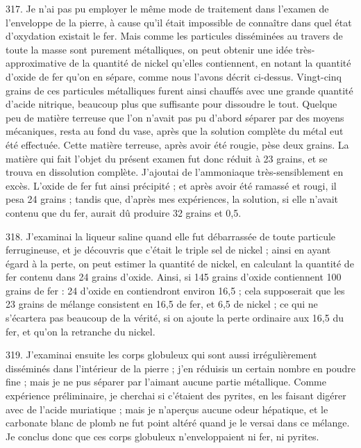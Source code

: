 \documentclass[a4paper, 11pt, oneside, polutonikogreek, french]{article}
\begin{document}
317. Je n'ai pas pu employer le même mode de traitement dans l'examen de l'enveloppe de la pierre, à cause qu'il était impossible de connaître dans quel état d'oxydation existait le fer. Mais comme les particules disséminées au travers de toute la masse sont purement métalliques, on peut obtenir une idée très-approximative de la quantité de nickel qu'elles contiennent, en notant la quantité d'oxide de fer qu'on en sépare, comme nous l'avons décrit ci-dessus. Vingt-cinq grains de ces particules métalliques furent ainsi chauffés avec une grande quantité d'acide nitrique, beaucoup plus que suffisante pour dissoudre le tout. Quelque peu de matière terreuse que l'on n'avait pas pu d'abord séparer par des moyens mécaniques, resta au fond du vase, après que la solution complète du métal eut été effectuée. Cette matière terreuse, après avoir été rougie, pèse deux grains. La matière qui fait l'objet du présent examen fut donc réduit à 23 grains, et se trouva en dissolution complète. J'ajoutai de l'ammoniaque très-sensiblement en excès. L'oxide de fer fut ainsi précipité ; et après avoir été ramassé et rougi, il pesa 24 grains ; tandis que, d'après mes expériences, la solution, si elle n'avait contenu que du fer, aurait dû produire 32 grains et 0,5.

318. J'examinai la liqueur saline quand elle fut débarrassée de toute particule ferrugineuse, et je découvris que c'était le triple sel de nickel ; ainsi en ayant égard à la perte, on peut estimer la quantité de nickel, en calculant la quantité de fer contenu dans 24 grains d'oxide. Ainsi, si 145 grains d'oxide contiennent 100 grains de fer : 24 d'oxide en contiendront environ 16,5 ; cela supposerait que les 23 grains de mélange consistent en 16,5 de fer, et 6,5 de nickel ; ce qui ne s'écartera pas beaucoup de la vérité, si on ajoute la perte ordinaire aux 16,5 du fer, et qu'on la retranche du nickel.

319. J'examinai ensuite les corps globuleux qui sont aussi irrégulièrement disséminés dans l'intérieur de la pierre ; j'en réduisis un certain nombre en poudre fine ; mais je ne pus séparer par l'aimant aucune partie métallique. Comme expérience préliminaire, je cherchai si c'étaient des pyrites, en les faisant digérer avec de l'acide muriatique ; mais je n'aperçus aucune odeur hépatique, et le carbonate blanc de plomb ne fut point altéré quand je le versai dans ce mélange. Je conclus donc que ces corps globuleux n'enveloppaient ni fer, ni pyrites.
\end{document}
